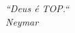\thispagestyle{empty}
\vspace*{\fill}
\begin{flushright}
	\textit{``Deus é TOP.``\\
	 Neymar}
\end{flushright}
\setcounter{footnote}{0}%